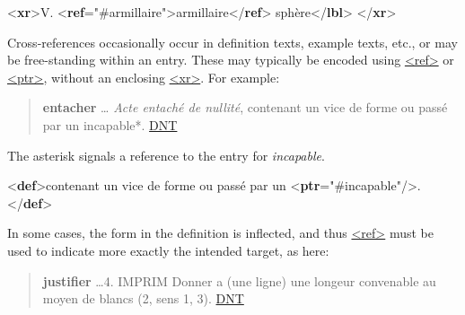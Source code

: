  \par\bgroup{}\exampleFont \begin{shaded}\noindent\mbox{}{<\textbf{xr}>}V. {<\textbf{ref}\hspace*{1em}{target}="{\#armillaire}">}armillaire{</\textbf{ref}>}\mbox{}\newline 
{}sphère{</\textbf{lbl}>}\mbox{}\newline 
{</\textbf{xr}>}\end{shaded}\egroup\par \par
Cross-references occasionally occur in definition texts, example texts, etc., or may be free-standing within an entry. These may typically be encoded using \hyperref[TEI.ref]{<ref>} or \hyperref[TEI.ptr]{<ptr>}, without an enclosing \hyperref[TEI.xr]{<xr>}. For example: 
\begin{quote}{\bfseries entacher} … {\itshape Acte entaché de nullité}, contenant un vice de forme ou passé par un incapable*. \hyperref[DIC-DNT]{DNT}\end{quote}
 The asterisk signals a reference to the entry for \textit{incapable}.\par\bgroup{}\exampleFont \begin{shaded}\noindent\mbox{}{<\textbf{def}>}contenant un vice de forme ou passé par un {<\textbf{ptr}\hspace*{1em}{target}="{\#incapable}"/>}.{</\textbf{def}>}\end{shaded}\egroup\par \noindent   In some cases, the form in the definition is inflected, and thus \hyperref[TEI.ref]{<ref>} must be used to indicate more exactly the intended target, as here:
\begin{quote}{\bfseries justifier} …4. IMPRIM Donner a (une ligne) une longeur convenable au moyen de blancs (2, sens 1, 3). \hyperref[DIC-DNT]{DNT}\end{quote}
